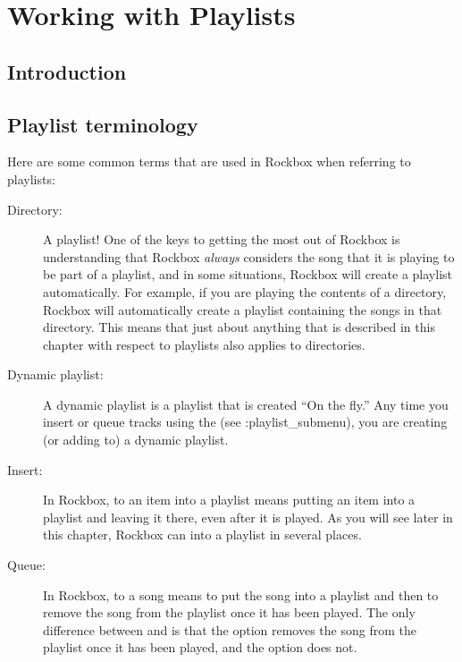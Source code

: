 \chapter{Working with Playlists}
\label{ref:working_with_playlists}

\section{Introduction}

\section{Playlist terminology}

Here are some common terms that are used in Rockbox when referring to playlists:

	\begin{description}
	
	\item[Directory:]  A playlist!  One of the keys to getting the most out of 
	Rockbox is understanding that Rockbox \emph{always} considers the song that it 
	is playing to be part of a playlist, and in some situations, Rockbox will 
	create a playlist automatically.  For example, if you are playing the contents 
	of a directory, Rockbox will automatically create a playlist containing the 
	songs in that directory.  This means that just about anything that is 
	described in this chapter with respect to playlists also applies to 
	directories.
	
	\item[Dynamic playlist:]  A dynamic playlist is a playlist that is created 
	``On the fly.''  Any time you insert or queue tracks using the 
	 (see \rockref:{playlist_submenu}), you are creating (or adding 
	to) a dynamic playlist.
	
	\item[Insert:] In Rockbox, to  an item into a playlist means 
	putting an item into a playlist and leaving it there, even after it is played. 
	As you will see later in this chapter, Rockbox can  into a 
	playlist in several places.
	
	\item[Queue:]  In Rockbox, to  a song means to put the song 
	into a playlist and then to remove the song from the playlist once it has been 
	played.  The only difference between  and  is 
	that the  option removes the song from the playlist once it has 
	been played, and the  option does not.


\end{description}
